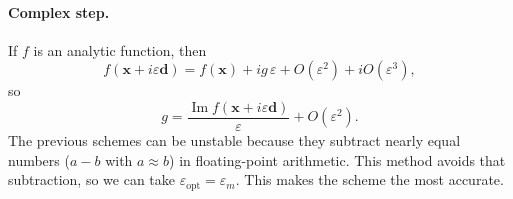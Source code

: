 \paragraph{Complex step.}
If $f$ is an analytic function, then
\[
  f(\mathbf{x}+i\varepsilon \mathbf{d})=f(\mathbf{x})+i g\,\varepsilon+O(\varepsilon^2)+iO(\varepsilon^3),
\]
so
\[
  g=\frac{\operatorname{Im} f(\mathbf{x}+i\varepsilon \mathbf{d})}{\varepsilon}
  +O(\varepsilon^2).
\]
The previous schemes can be unstable because they subtract nearly equal numbers ($a-b$
with $a \approx b$) in floating-point arithmetic. This method avoids that subtraction, so we
can take $\varepsilon_{\mathrm{opt}}=\varepsilon_m$. This makes the scheme the most accurate.
